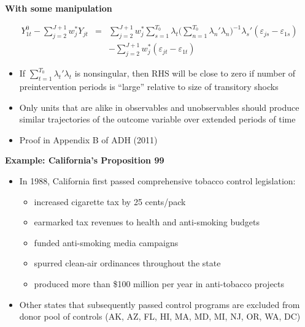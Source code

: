 \documentclass[notes=show]{beamer}
\begin{document}
\begin{frame}[plain]
\begin{center}
\textbf{With some manipulation}
\end{center}

\begin{eqnarray*}
Y^0_{1t} - \sum^{J+1}_{j=2}w^*_jY_{jt} &=& \sum_{j=2}^{J+1} w_j^* \sum_{s=1}^{T_0} \lambda_t \bigg ( \sum_{n=1}^{T_0} \lambda_n'\lambda_n \bigg )
^{-1} \lambda_s'(\varepsilon_{js} - \varepsilon_{1s} ) \\
&& - \sum_{j=2}^{J+1} w_j^* (\varepsilon_{jt} - \varepsilon_{1t})
\end{eqnarray*}

\begin{itemize}
\item If $\sum_{t=1}^{T_0} \lambda_t' \lambda_t$ is nonsingular, then RHS will be close to zero if number of preintervention periods is ``large''  relative to size of transitory shocks 
\item Only units that are alike in observables and unobservables should produce similar trajectories of the outcome variable over extended periods of time
\item Proof in Appendix B of ADH (2011)
\end{itemize}


\end{frame}


\begin{frame}[plain]
	\begin{center}
	\textbf{Example: California's Proposition 99}
	\end{center}
	
	\begin{itemize}
	\item In 1988, California first passed comprehensive tobacco control legislation:
		\begin{itemize}
		\item increased cigarette tax by 25 cents/pack
		\item earmarked tax revenues to health and anti-smoking budgets
		\item funded anti-smoking media campaigns
		\item spurred clean-air ordinances throughout the state
		\item produced more than \$100 million per year in anti-tobacco projects
		\end{itemize}
	\item Other states that subsequently passed control programs are excluded from donor pool of controls (AK, AZ, FL, HI, MA, MD, MI, NJ, OR, WA, DC)
	\end{itemize}
\end{frame}
\end{document}
